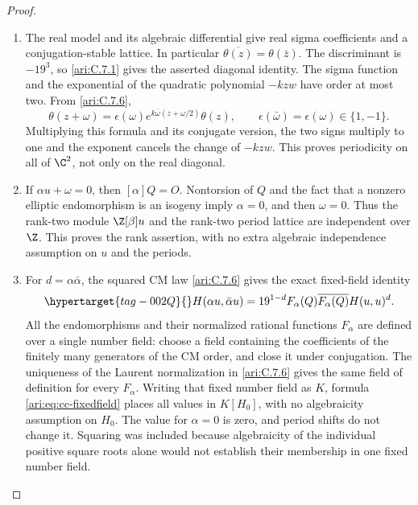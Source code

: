 \begin{proof}
\begin{enumerate}[label=\arabic*.,leftmargin=*]
\item The real model and its algebraic differential give real sigma
coefficients and a conjugation-stable lattice. In particular
$\overline{\theta(z)}=\theta(\bar z)$. The discriminant is
$-19^3$, so \ref{ari:C.7.1} gives the asserted diagonal identity.
The sigma function and the exponential of the quadratic
polynomial $-kzw$ have order at most two. From \ref{ari:C.7.6},
\[
 \theta(z+\omega)=\epsilon(\omega)
         e^{k\bar\omega(z+\omega/2)}\theta(z),
 \qquad \epsilon(\bar\omega)=\epsilon(\omega)\in\{1,-1\}.
\]
Multiplying this formula and its conjugate version, the two
signs multiply to one and the exponent cancels the change of
$-kzw$. This proves periodicity on all of $\C^2$, not only
on the real diagonal.

\item If $\alpha u+\omega=0$, then $[\alpha]Q=O$.
Nontorsion of $Q$ and the fact that a nonzero elliptic
endomorphism is an isogeny imply $\alpha=0$, and then
$\omega=0$. Thus the rank-two module $\Z[\beta]u$ and the
rank-two period lattice are independent over $\Z$.
This proves the rank assertion, with no extra algebraic
independence assumption on $u$ and the periods.

\item For $d=\alpha\bar\alpha$, the squared CM law \ref{ari:C.7.6} gives
the exact fixed-field identity
\begin{equation}\hypertarget{tag-002Q}{}\label{ari:eq:cc-fixedfield}
 H(\alpha u,\bar\alpha u)
   =19^{1-d}F_\alpha(Q)\overline{F_\alpha(Q)}H(u,u)^d.
\end{equation}
All the endomorphisms and their normalized rational functions
$F_\alpha$ are defined over a single number field: choose
a field containing the coefficients of the finitely many
generators of the CM order, and close it under conjugation.
The uniqueness of the Laurent normalization in \ref{ari:C.7.6} gives
the same field of definition for every $F_\alpha$.
Writing that fixed number field as $K$, formula
\eqref{ari:eq:cc-fixedfield} places all values in $K[H_0]$,
with no algebraicity assumption on $H_0$.
The value for $\alpha=0$ is zero, and period shifts do not
change it. Squaring was included because algebraicity of the
individual positive square roots alone would not establish
their membership in one fixed number field.


\end{enumerate}
\end{proof}
